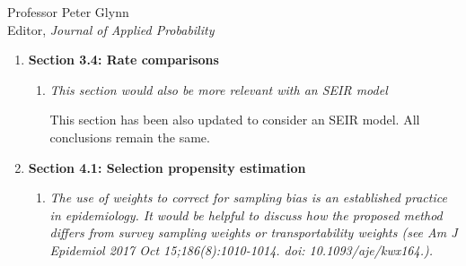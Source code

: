 \documentclass[11pt]{letter} %
\begin{document}
\begin{letter}{Professor
	Peter Glynn\\
	Editor, {\em Journal of Applied Probability}}
\begin{enumerate}
\begin{enumerate}
	\noindent Note that for the SIR model, the basic reproduction number is~$R_0 = 1 + \frac{1}{\gamma} \Lambda$. So estimate of the instantaneous reproduction number is obtained by replacing $\Lambda$ by an estimate of the  instantaneous growth rate $\hat \Lambda_t = \log (K_t / K_{t-1})$.  Then using the approximate relationship between the SEIR model and an SIR model with infectious period $1/\gamma + 1/\sigma$, we arrive at the new moment-based estimator
	$$
    R_t \approx 1 + \left( \frac{1}{\gamma} + \frac{1}{\sigma} \right) \log \left( \frac{K_t}{K_{t-1}} \right).
	$$
	The updated $R_t$ estimator shows that the same intuition about the error holds when we are considering an SEIR rather than an SIR model.  Figure 3b shows the reproduction number estimates and potential biases under SEIR dynamics which shows the same general conclusions hold.  For completeness, we also present the instantaneous reproduction number estimates using the proposal of Cori et. al. (2014) in Section I of the supplementary materials, which shows the same general conclusions.
\end{enumerate}
\item {\bf Section 3.4: Rate comparisons}
\begin{enumerate}
	\item {\it This section would also be more relevant with an SEIR model}
	\vspace{5mm}

	This section has been also updated to consider an SEIR model.  All conclusions remain the same.
	\vspace{5mm}
\end{enumerate}
\item {\bf Section 4.1: Selection propensity estimation}
\begin{enumerate}
	\item {\it The use of weights to correct for sampling bias is an established practice in epidemiology. It would be helpful to discuss how the proposed method differs from survey sampling weights or transportability weights (see Am J Epidemiol 2017 Oct 15;186(8):1010-1014. doi: 10.1093/aje/kwx164.).}
	\vspace{5mm}


\end{enumerate}
\end{enumerate}
\end{letter}
\end{document}
